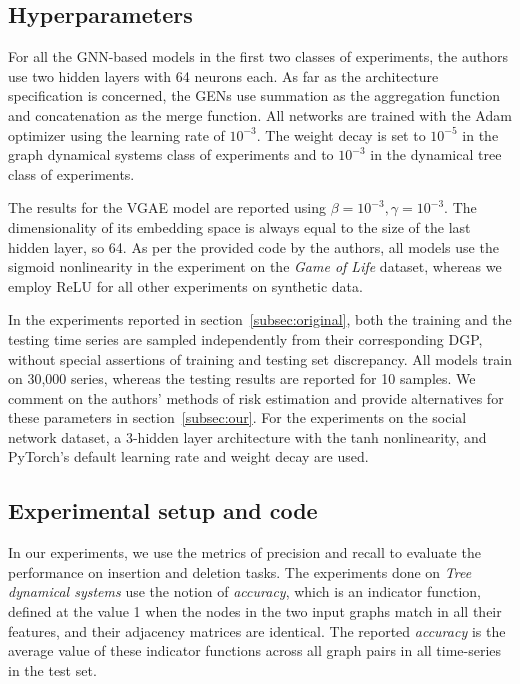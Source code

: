 \subsection{Hyperparameters}
For all the GNN-based models in the first two classes of experiments, the authors use two hidden layers with 64 neurons each. As far as the architecture specification is concerned, the GENs use summation as the aggregation function and concatenation as the merge function. All networks are trained with the Adam optimizer using the learning rate of $10^{-3}$. The weight decay is set to $10^{-5}$ in the graph dynamical systems class of experiments and to $10^{-3}$ in the dynamical tree class of experiments.

The results for the VGAE model are reported using $\beta=10^{-3}, \gamma=10^{-3}$. The dimensionality of its embedding space is always equal to the size of the last hidden layer, so 64. As per the provided code by the authors, all models use the sigmoid nonlinearity in the experiment on the \textit{Game of Life} dataset, whereas we employ ReLU for all other experiments on synthetic data.

In the experiments reported in section~\ref{subsec:original}, both the training and the testing time series are sampled independently from their corresponding DGP, without special assertions of training and testing set discrepancy. 
All models train on 30,000 series, whereas the testing results are reported for 10 samples. We comment on the authors' methods of risk estimation and provide alternatives for these parameters in section~\ref{subsec:our}. For the experiments on the social network dataset, a 3-hidden layer architecture with the tanh nonlinearity, and PyTorch's default learning rate and weight decay are used.


\subsection{Experimental setup and code}
\label{sec:methodology}
In our experiments, we use the metrics of precision and recall to evaluate the performance on insertion and deletion tasks. The experiments done on \textit{Tree dynamical systems} use the notion of \textit{accuracy}, which is an indicator function, defined at the value 1 when the nodes in the two input graphs match in all their features, and their adjacency matrices are identical. The reported \textit{accuracy} is the average value of these indicator functions across all graph pairs in all time-series in the test set.

